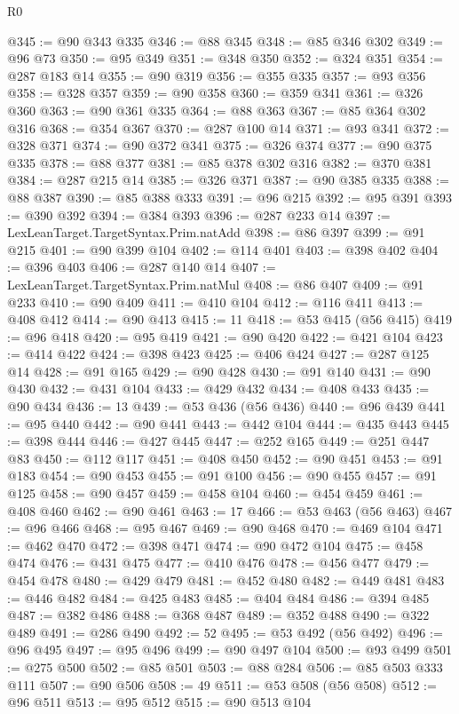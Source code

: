 \begin{lexlean}{R0}
\begin{coremodule}
@345 := @90 @343 @335
@346 := @88 @345
@348 := @85 @346 @302
@349 := @96 @73
@350 := @95 @349
@351 := @348 @350
@352 := @324 @351
@354 := @287 @183 @14
@355 := @90 @319
@356 := @355 @335
@357 := @93 @356
@358 := @328 @357
@359 := @90 @358
@360 := @359 @341
@361 := @326 @360
@363 := @90 @361 @335
@364 := @88 @363
@367 := @85 @364 @302 @316
@368 := @354 @367
@370 := @287 @100 @14
@371 := @93 @341
@372 := @328 @371
@374 := @90 @372 @341
@375 := @326 @374
@377 := @90 @375 @335
@378 := @88 @377
@381 := @85 @378 @302 @316
@382 := @370 @381
@384 := @287 @215 @14
@385 := @326 @371
@387 := @90 @385 @335
@388 := @88 @387
@390 := @85 @388 @333
@391 := @96 @215
@392 := @95 @391
@393 := @390 @392
@394 := @384 @393
@396 := @287 @233 @14
@397 := LexLeanTarget.TargetSyntax.Prim.natAdd
@398 := @86 @397
@399 := @91 @215
@401 := @90 @399 @104
@402 := @114 @401
@403 := @398 @402
@404 := @396 @403
@406 := @287 @140 @14
@407 := LexLeanTarget.TargetSyntax.Prim.natMul
@408 := @86 @407
@409 := @91 @233
@410 := @90 @409
@411 := @410 @104
@412 := @116 @411
@413 := @408 @412
@414 := @90 @413
@415 := 11
@418 := @53 @415 (@56 @415)
@419 := @96 @418
@420 := @95 @419
@421 := @90 @420
@422 := @421 @104
@423 := @414 @422
@424 := @398 @423
@425 := @406 @424
@427 := @287 @125 @14
@428 := @91 @165
@429 := @90 @428
@430 := @91 @140
@431 := @90 @430
@432 := @431 @104
@433 := @429 @432
@434 := @408 @433
@435 := @90 @434
@436 := 13
@439 := @53 @436 (@56 @436)
@440 := @96 @439
@441 := @95 @440
@442 := @90 @441
@443 := @442 @104
@444 := @435 @443
@445 := @398 @444
@446 := @427 @445
@447 := @252 @165
@449 := @251 @447 @83
@450 := @112 @117
@451 := @408 @450
@452 := @90 @451
@453 := @91 @183
@454 := @90 @453
@455 := @91 @100
@456 := @90 @455
@457 := @91 @125
@458 := @90 @457
@459 := @458 @104
@460 := @454 @459
@461 := @408 @460
@462 := @90 @461
@463 := 17
@466 := @53 @463 (@56 @463)
@467 := @96 @466
@468 := @95 @467
@469 := @90 @468
@470 := @469 @104
@471 := @462 @470
@472 := @398 @471
@474 := @90 @472 @104
@475 := @458 @474
@476 := @431 @475
@477 := @410 @476
@478 := @456 @477
@479 := @454 @478
@480 := @429 @479
@481 := @452 @480
@482 := @449 @481
@483 := @446 @482
@484 := @425 @483
@485 := @404 @484
@486 := @394 @485
@487 := @382 @486
@488 := @368 @487
@489 := @352 @488
@490 := @322 @489
@491 := @286 @490
@492 := 52
@495 := @53 @492 (@56 @492)
@496 := @96 @495
@497 := @95 @496
@499 := @90 @497 @104
@500 := @93 @499
@501 := @275 @500
@502 := @85 @501
@503 := @88 @284
@506 := @85 @503 @333 @111
@507 := @90 @506
@508 := 49
@511 := @53 @508 (@56 @508)
@512 := @96 @511
@513 := @95 @512
@515 := @90 @513 @104

\end{coremodule}
\end{lexlean}
